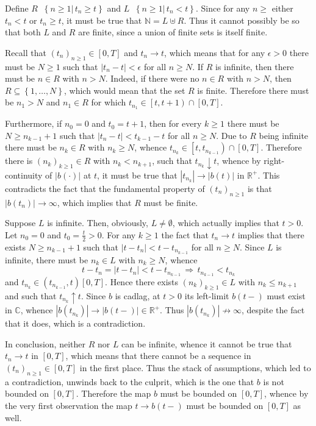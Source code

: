 \documentclass[a4paper]{article}
\newcommand{\obj}[1]{\left\{ #1 \right \}}
\newcommand{\clo}[1]{\left [ #1 \right ]}
\newcommand{\clop}[1]{\left [ #1 \right )}
\newcommand{\brac}[1]{\left ( #1 \right )}
\newcommand{\induc}[1]{\left . #1 \right \vert}
\newcommand{\abs}[1]{\left | #1 \right |}
\newcommand{\Real}{\mathbb{R}}
\newcommand{\Cplx}{\mathbb{C}}
\newcommand{\defn}{\mathop{\overset{\Delta}{=}}\nolimits}
\begin{document}
Define $R\defn \obj{\induc{n\geq 1}\,t_n\geq t}$ and $L\defn \obj{\induc{n\geq 1}\,t_n < t}$. Since for any $n\geq$ either $t_n<t$ or $t_n\geq t$, it must be true that $\mathbb{N}=L \uplus R$.  Thus it cannot possibly be so that both $L$ and $R$ are finite, since a union of finite sets is itself finite.

Recall that $\brac{t_n}_{n\geq1}\in \clo{0,T}$ and $t_n\to t$, which means that for any $\epsilon>0$ there must be $N\geq1$ such that $\abs{t_n-t}<\epsilon$ for all $n\geq N$. If $R$ is infinite, then there must be $n\in R$ with $n>N$. Indeed, if there were no $n\in R$ with $n>N$, then $R\subseteq \obj{1,\ldots,N}$, which would mean that the set $R$ is finite. Therefore there must be $n_1>N$ and $n_1\in R$ for which $t_{n_1}\in \clop{t,t+1}\cap \clo{0,T}$.

Furthermore, if $n_0=0$ and $t_0=t+1$, then for every $k\geq1$ there must be $N\geq n_{k-1}+1$ such that $\abs{t_n-t}<t_{k-1}-t$ for all $n\geq N$. Due to $R$ being infinite there must be $n_k\in R$ with $n_k\geq N$, whence $t_{n_k}\in \clop{t,t_{n_{k-1}}}\cap \clo{0,T}$. Therefore there is $\brac{n_k}_{k\geq1}\in R$ with $n_k<n_{k+1}$, such that $t_{n_k}\downarrow t$, whence by right-continuity of $\abs{b\brac{\cdot}}$ at $t$, it must be true that $\abs{t_{n_k}}\to\abs{b\brac{t}}$ in $\Real^+$. This contradicts the fact that the fundamental property of $\brac{t_n}_{n\geq1}$ is that $\abs{b\brac{t_n}}\to\infty$, which implies that $R$ must be finite.

Suppose $L$ is infinite. Then, obviously, $L\neq \emptyset$, which actually implies that $t>0$. Let $n_0=0$ and $t_0=\frac{t}{2}>0$. For any $k\geq1$ the fact that $t_n\to t$ implies that there exists $N\geq n_{k-1}+1$ such that $\abs{t-t_n}<t-t_{n_{k-1}}$ for all $n\geq N$. Since $L$ is infinite, there must be $n_k\in L$ with $n_k\geq N$, whence \[t-t_n=\abs{t-t_n}<t-t_{n_{k-1}}\,\Rightarrow\, t_{n_{k-1}}<t_{n_k}\] and $t_{n_k}\in \brac{t_{n_{k-1}}, t}\clo{0,T}$. Hence there exists $\brac{n_k}_{k\geq1}\in L$ with $n_k\leq n_{k+1}$ and such that $t_{n_k}\uparrow t$. Since $b$ is cadlag, at $t>0$ its left-limit $b\brac{t-}$ must exist in $\Cplx$, whence $\abs{b\brac{t_{n_k}}}\to\abs{b\brac{t-}}\in \Real^+$. Thus $\abs{b\brac{t_{n_k}}}\not\to\infty$, despite the fact that it does, which is a contradiction.

In conclusion, neither $R$ nor $L$ can be infinite, whence it cannot be true that $t_n\to t$ in $\clo{0,T}$, which means that there cannot be a sequence in $\brac{t_n}_{n\geq1}\in \clo{0,T}$ in the first place. Thus the stack of assumptions, which led to a contradiction, unwinds back to the culprit, which is the one that $b$ is not bounded on $\clo{0,T}$. Therefore the map $b$ must be bounded on $\clo{0,T}$, whence by the very first observation the map $t\to b\brac{t-}$ must be bounded on $\clo{0,T}$ as well.
\end{document}
